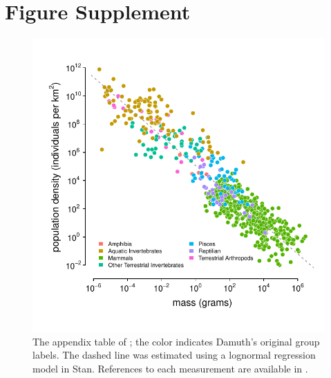 \documentclass[11pt]{article}
\begin{document}
\section{Figure Supplement}

\setcounter{figure}{0}
\renewcommand{\thefigure}{}
\renewcommand{\figurename}{Figure 1-figure supplement 1}

\begin{figure}[!htb]
  \centering
  \includegraphics[]{figures/damuth.pdf}

  \caption{The appendix table of \textcite{Damuth1987-sg}; the color indicates
    Damuth's original group labels. The dashed line was estimated using a
    lognormal regression model in Stan. References to each measurement are
  available in \textcite{Damuth1987-sg}.}
  \label{suppfig:damuth}
\end{figure}
\end{document}
